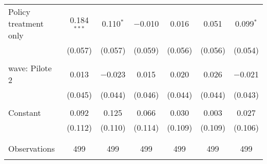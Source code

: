 \begin{tabular}{@{\extracolsep{5pt}}lcccccc}
 Policy treatment only & 0.184$^{***}$ & 0.110$^{*}$ & $-$0.010 & 0.016 & 0.051 & 0.099$^{*}$ \\ 
  & (0.057) & (0.057) & (0.059) & (0.056) & (0.056) & (0.054) \\ 
  & & & & & & \\ 
 wave: Pilote 2 & 0.013 & $-$0.023 & 0.015 & 0.020 & 0.026 & $-$0.021 \\ 
  & (0.045) & (0.044) & (0.046) & (0.044) & (0.044) & (0.043) \\ 
  & & & & & & \\ 
 Constant & 0.092 & 0.125 & 0.066 & 0.030 & 0.003 & 0.027 \\ 
  & (0.112) & (0.110) & (0.114) & (0.109) & (0.109) & (0.106) \\ 
  & & & & & & \\ 
\hline \\[-1.8ex] 

Observations & 499 & 499 & 499 & 499 & 499 & 499 \\ 
\hline 
\hline \\[-1.8ex] 
\end{tabular} 
